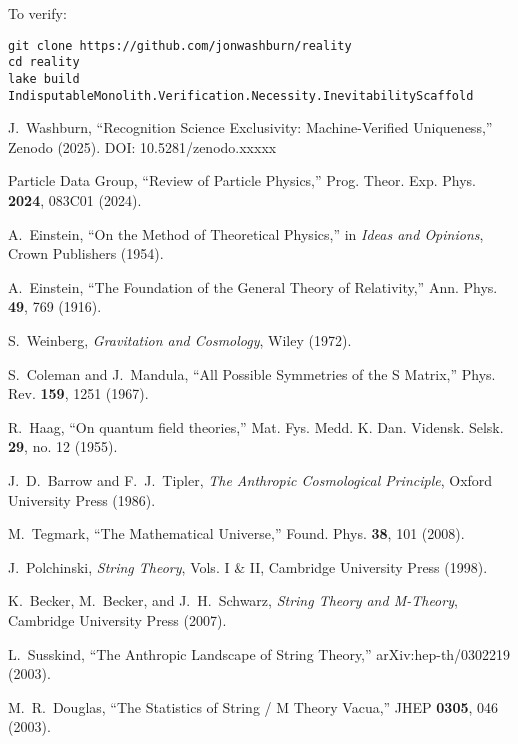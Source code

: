 \documentclass[12pt]{article}
\theoremstyle{remark}
\begin{document}
\begin{appendix}
\noindent To verify:
\begin{verbatim}
git clone https://github.com/jonwashburn/reality
cd reality
lake build IndisputableMonolith.Verification.Necessity.InevitabilityScaffold
\end{verbatim}

\end{appendix}

\begin{thebibliography}{99}

J.~Washburn,
``Recognition Science Exclusivity: Machine-Verified Uniqueness,''
Zenodo (2025). DOI: 10.5281/zenodo.xxxxx

Particle Data Group,
``Review of Particle Physics,''
Prog. Theor. Exp. Phys. \textbf{2024}, 083C01 (2024).

A.~Einstein,
``On the Method of Theoretical Physics,'' in \emph{Ideas and Opinions},
Crown Publishers (1954).

A.~Einstein,
``The Foundation of the General Theory of Relativity,''
Ann. Phys. \textbf{49}, 769 (1916).

S.~Weinberg,
\emph{Gravitation and Cosmology},
Wiley (1972).

S.~Coleman and J.~Mandula,
``All Possible Symmetries of the S Matrix,''
Phys. Rev. \textbf{159}, 1251 (1967).

R.~Haag,
``On quantum field theories,''
Mat. Fys. Medd. K. Dan. Vidensk. Selsk. \textbf{29}, no. 12 (1955).

J.~D.~Barrow and F.~J.~Tipler,
\emph{The Anthropic Cosmological Principle},
Oxford University Press (1986).

M.~Tegmark,
``The Mathematical Universe,''
Found. Phys. \textbf{38}, 101 (2008).

J.~Polchinski,
\emph{String Theory}, Vols. I \& II,
Cambridge University Press (1998).

K.~Becker, M.~Becker, and J.~H.~Schwarz,
\emph{String Theory and M-Theory},
Cambridge University Press (2007).

L.~Susskind,
``The Anthropic Landscape of String Theory,''
arXiv:hep-th/0302219 (2003).

M.~R.~Douglas,
``The Statistics of String / M Theory Vacua,''
JHEP \textbf{0305}, 046 (2003).


\end{thebibliography}
\end{document}
